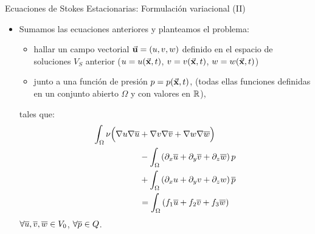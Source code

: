 \documentclass[9pt, dvipsnames,]{beamer}
\begin{document}
\begin{frame}{Ecuaciones de Stokes Estacionarias: Formulación variacional (II)}
  \begin{itemize}
  \item Sumamos las ecuaciones anteriores y planteamos el problema:
    \begin{itemize}
    \item hallar un campo vectorial $\vec{\mathbf{u}}=(u,v,w)$ definido
    en el espacio de soluciones $V_S$ anterior ($u=u(\vec{\mathbf{x}},t)$,
    $v=v(\vec{\mathbf{x}},t)$, $w=w(\vec{\mathbf{x}},t)$)
  \item junto a una función de presión $p=p(\vec{\mathbf{x}},t)$,
    (todas ellas funciones definidas en un conjunto abierto $\Omega$ y
    con valores en ${\mathbb R}$),
  \end{itemize}
  tales que:
    \begin{align*}
      \int_\Omega \nu\Big( \nabla u\nabla \overline u &+
      \nabla v\nabla \overline v + \nabla w\nabla \overline w \Big)
      \\
      &- \int_\Omega \left( \partial_x \overline u + \partial_y \overline v + \partial_z \overline w \right) p
      \\
      &+ \int_\Omega \left( \partial_x u + \partial_y v + \partial_z w \right) \overline {p}
      \\
      &= \int_\Omega \left( f_1 \overline u + f_2 \overline v + f_3 \overline w \right)
    \end{align*}
    $\forall \overline u,\overline v, \overline w\in V_0$, $\forall\overline {p}\in Q$.
  \end{itemize}

\end{frame}
\end{document}
